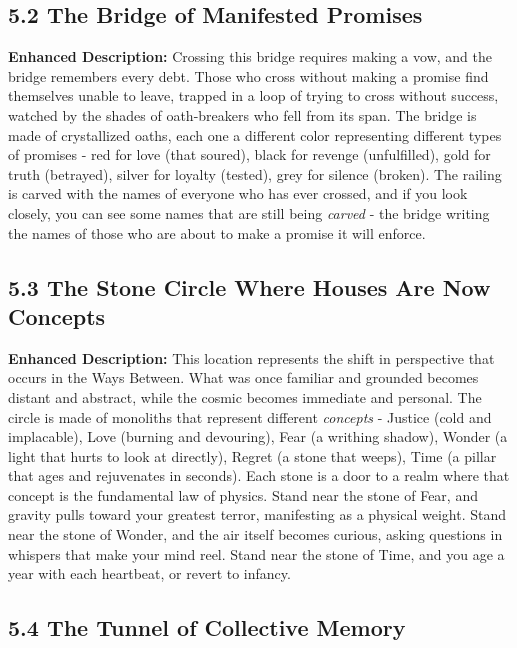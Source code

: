\documentclass[11pt]{article}
\begin{document}
\subsection*{5.2 The Bridge of Manifested Promises}

\textbf{Enhanced Description:} Crossing this bridge requires making a vow, and the bridge remembers every debt. Those who cross without making a promise find themselves unable to leave, trapped in a loop of trying to cross without success, watched by the shades of oath-breakers who fell from its span. The bridge is made of crystallized oaths, each one a different color representing different types of promises - red for love (that soured), black for revenge (unfulfilled), gold for truth (betrayed), silver for loyalty (tested), grey for silence (broken). The railing is carved with the names of everyone who has ever crossed, and if you look closely, you can see some names that are still being \textit{carved} - the bridge writing the names of those who are about to make a promise it will enforce.

\subsection*{5.3 The Stone Circle Where Houses Are Now Concepts}

\textbf{Enhanced Description:} This location represents the shift in perspective that occurs in the Ways Between. What was once familiar and grounded becomes distant and abstract, while the cosmic becomes immediate and personal. The circle is made of monoliths that represent different \textit{concepts} - Justice (cold and implacable), Love (burning and devouring), Fear (a writhing shadow), Wonder (a light that hurts to look at directly), Regret (a stone that weeps), Time (a pillar that ages and rejuvenates in seconds). Each stone is a door to a realm where that concept is the fundamental law of physics. Stand near the stone of Fear, and gravity pulls toward your greatest terror, manifesting as a physical weight. Stand near the stone of Wonder, and the air itself becomes curious, asking questions in whispers that make your mind reel. Stand near the stone of Time, and you age a year with each heartbeat, or revert to infancy.

\subsection*{5.4 The Tunnel of Collective Memory}
\end{document}
